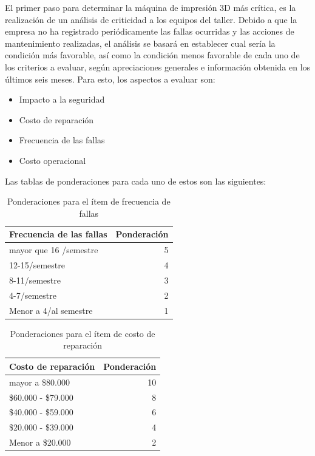 El primer paso para determinar la máquina de impresión 3D más crítica, es la realización de un análisis de criticidad a los equipos del taller. Debido a que la empresa no ha registrado periódicamente las fallas ocurridas y las acciones de mantenimiento realizadas, el análisis se basará en establecer cual sería la condición más favorable, así como la condición menos favorable de cada uno de los criterios a evaluar, según apreciaciones generales e información obtenida en los últimos seis meses. Para esto, los aspectos a evaluar son:

\begin{itemize}
\item Impacto a la seguridad
\item Costo de reparación
\item Frecuencia de las fallas
\item Costo operacional
\end{itemize}

Las tablas de ponderaciones para cada uno de estos son las siguientes:

\begin{table}[H]
  \centering
  
    \begin{tabular}{|l|r|}
    \hline
    Frecuencia de las fallas & \multicolumn{1}{l|}{Ponderación} \\
    \hline
    mayor que 16 /semestre & 5 \\
    \hline
    12-15/semestre & 4 \\
    \hline
    8-11/semestre & 3 \\
    \hline
    4-7/semestre & 2 \\
    \hline
    Menor a 4/al semestre & 1 \\
    \hline
    \end{tabular}%
    \caption{Ponderaciones para el ítem de frecuencia de fallas}
  \label{tab:addlabel}%
\end{table}%

\qquad\qquad%

\begin{table}[H]
  \centering
 
    \begin{tabular}{|l|r|}
    \hline
    Costo de reparación & \multicolumn{1}{l|}{Ponderación} \\
    \hline
    mayor a \$80.000 & 10 \\
    \hline
    \$60.000 - \$79.000 & 8 \\
    \hline
    \$40.000 - \$59.000 & 6 \\
    \hline
    \$20.000 - \$39.000 & 4 \\
    \hline
    Menor a \$20.000 & 2 \\
    \hline
    \end{tabular}%
    \caption{Ponderaciones para el ítem de costo de reparación}
  \label{tab:addlabel}%
\end{table}%

